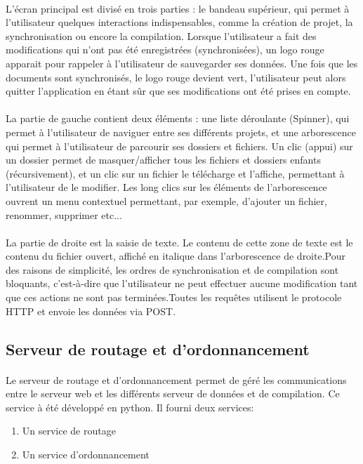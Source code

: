 \documentclass[a4paper,12pt]{article}
\begin{document}
\paragraph*{}

L'écran principal est divisé en trois parties : le bandeau supérieur, qui permet à l'utilisateur quelques interactions indispensables, comme la création de projet, la synchronisation ou encore la compilation. Lorsque l'utilisateur a fait des modifications qui 
n'ont pas été enregistrées (synchronisées), un logo rouge apparait pour rappeler à l'utilisateur de sauvegarder ses données. Une fois que les documents sont synchronisés, le logo rouge devient vert, l'utilisateur peut alors quitter l'application en étant sûr que ses 
modifications ont été prises en compte.
\paragraph*{}
La partie de gauche contient deux éléments : une liste déroulante (Spinner), qui permet à l'utilisateur de naviguer entre ses différents projets, et une arborescence qui permet à l'utilisateur de parcourir ses dossiers et fichiers. Un clic (appui) sur un dossier 
permet de masquer/afficher tous les fichiers et dossiers enfants (récursivement), et un clic sur un fichier le télécharge et l'affiche, permettant à l'utilisateur de le modifier. Les long clics sur les éléments de l'arborescence ouvrent un menu contextuel permettant, 
par exemple, d'ajouter un fichier, renommer, supprimer etc...
\paragraph*{}
La partie de droite est la saisie de texte. Le contenu de cette zone de texte est le contenu du fichier ouvert, affiché en italique dans l'arborescence de droite.Pour des raisons de simplicité, les ordres de synchronisation et de compilation sont bloquants, c'est-à-dire que l'utilisateur ne peut effectuer aucune modification tant que ces actions ne sont pas terminées.Toutes les requêtes utilisent le protocole HTTP et envoie les données via POST.


\subsection{Serveur de routage et d'ordonnancement}
\paragraph*{}
Le serveur de routage et d'ordonnancement permet de géré les communications entre le serveur web et les différents serveur de données et de compilation. Ce service à été développé en python. Il fourni deux services:
\begin{enumerate}
 \item Un service de routage
 \item Un service d'ordonnancement
\end{enumerate}
\end{document}
